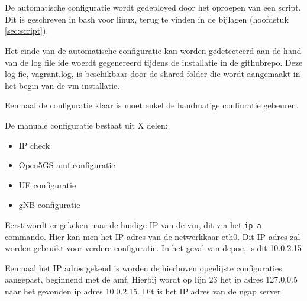 \section{}%
\label{sec:Config}%

De automatische configuratie wordt gedeployed door het oproepen van een script. Dit is geschreven in bash voor linux, terug te vinden in de bijlagen (hoofdstuk \ref{sec:script}).

Het einde van de automatische configuratie kan worden gedetecteerd aan de hand van de log file ide woerdt gegenereerd tijdens de installatie in de githubrepo. Deze log fie, vagrant.log, is beschikbaar door de shared folder die wordt aangemaakt in het begin van de \gls{vm} installatie. 

Eenmaal de configuratie klaar is moet enkel de handmatige confiuratie gebeuren.

De manuale configuratie bestaat uit X delen:

\begin{itemize}
    \item IP check
    \item Open5GS amf configuratie
    \item UE configuratie
    \item gNB configuratie
\end{itemize}

Eerst wordt er gekeken naar de huidige IP van de \gls{vm}, dit via het \verb|ip a| commando. Hier kan men het IP adres van de netwerkkaar eth0. Dit IP adres zal worden gebruikt voor verdere configuratie. In het geval van de\gls{poc}, is dit 10.0.2.15

Eenmaal het IP adres gekend is worden de hierboven opgelijste configuraties aangepast, beginnend met de amf. Hierbij wordt op lijn 23 het ip adres 127.0.0.5 naar het gevonden ip adres 10.0.2.15. Dit is het IP  adres van de ngap server.






